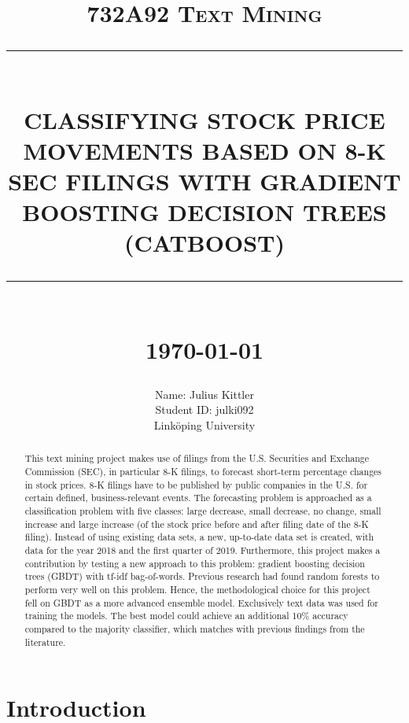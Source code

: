 \documentclass{article}
\newcommand{\HRule}[1]{\rule{\linewidth}{#1}}
\begin{document}
	
	\title{\textsc{732A92 Text Mining} \\ [2.0cm]
		\HRule{0.5pt} \\
		\LARGE \textbf{\uppercase{Classifying Stock Price Movements based on 8-K SEC filings with Gradient Boosting Decision Trees (CatBoost)}}
		\HRule{2pt} \\ [0.5cm]
		\normalsize \today \vspace*{5\baselineskip}}
	
	\date{}
	
	\author{
		Name: Julius Kittler \\ 
		Student ID: julki092 \\ 
		Link\"{o}ping University}
	
	\maketitle
	\newpage
	
	\begin{abstract}
		
	This text mining project makes use of filings from the U.S. Securities and Exchange Commission (SEC), in particular 8-K filings, to forecast short-term percentage changes in stock prices. 8-K filings have to be published by public companies in the U.S. for certain defined, business-relevant events. The forecasting problem is approached as a classification problem with five classes: large decrease, small decrease, no change, small increase and large increase (of the stock price before and after filing date of the 8-K filing). Instead of using existing data sets, a new, up-to-date data set is created, with data for the year 2018 and the first quarter of 2019. Furthermore, this project makes a contribution by testing a new approach to this problem: gradient boosting decision trees (GBDT) with tf-idf bag-of-words. Previous research had found random forests to perform very well on this problem. Hence, the methodological choice for this project fell on GBDT as a more advanced ensemble model. Exclusively text data was used for training the models. The best model could achieve an additional 10\% accuracy compared to the majority classifier, which matches with previous findings from the literature.
	
	\end{abstract}

	\newpage
	\tableofcontents
	\newpage
	\listoffigures
	\listoftables
	\newpage

	\section{Introduction}
	
\end{document}

